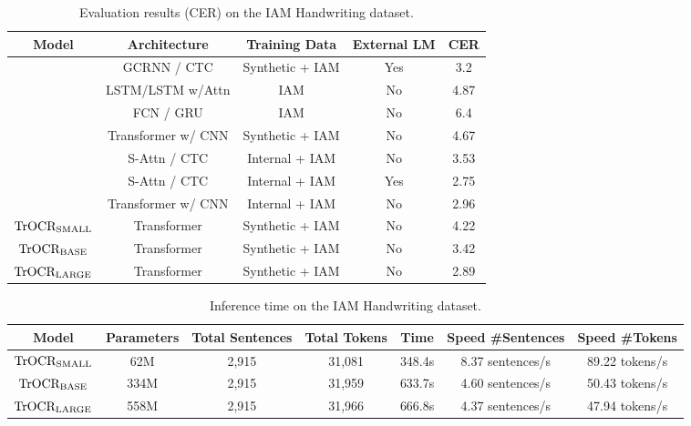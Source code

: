 \documentclass[letterpaper]{article} \usepackage{aaai23}  \usepackage{times}  \usepackage{helvet}  \usepackage{courier}  \usepackage[hyphens]{url}  \usepackage{graphicx} \urlstyle{rm} \def\UrlFont{\rm}  \usepackage{natbib}  \usepackage{caption} \frenchspacing  \setlength{\pdfpagewidth}{8.5in} \setlength{\pdfpageheight}{11in} \usepackage{algorithm}
\begin{document}
\begin{table*}[ht]
\centering
\begin{tabular}{ccccc}
\hline
\textbf{Model}      &\textbf{Architecture}             & \textbf{Training Data}   & \textbf{External LM} & \textbf{CER} \\ \hline

\cite{bluche2017gated}   &   GCRNN / CTC     & Synthetic + IAM          & Yes                  & 3.2          \\
\cite{michael2019evaluating}& LSTM/LSTM w/Attn  & IAM                      & No                   & 4.87         \\ 
\cite{wang2020decoupled}  &    FCN / GRU    & IAM                      & No                   & 6.4          \\

\cite{kang2020pay}      &    Transformer w/ CNN     & Synthetic + IAM          & No                   & 4.67         \\

\cite{diaz2021rethinking} & S-Attn / CTC      & Internal + IAM           & No                  & 3.53      \\
\cite{diaz2021rethinking}  &  S-Attn / CTC    & Internal + IAM          & Yes                  & 2.75         \\
\cite{diaz2021rethinking}  &  Transformer w/ CNN    & Internal + IAM          & No                  & 2.96         \\
\hline
$\textrm{TrOCR}_{\rm SMALL}$            &  Transformer        & Synthetic + IAM          & No                   & 4.22             \\
$\textrm{TrOCR}_{\rm BASE}$             &  Transformer        & Synthetic + IAM          & No                   & 3.42             \\
$\textrm{TrOCR}_{\rm LARGE}$             &   Transformer      & Synthetic + IAM          & No                   & 2.89             \\
\hline
\end{tabular}
\caption{Evaluation results (CER) on the IAM Handwriting dataset.}
\label{tab:iam}
\end{table*}


\begin{table*}
\centering
\begin{tabular}{ccccccc}\hline
\textbf{Model}       & \textbf{Parameters} & \textbf{Total Sentences} & \textbf{Total Tokens} & \textbf{Time}   & \textbf{Speed \#Sentences} & \textbf{Speed \#Tokens} \\
\hline
$\textrm{TrOCR}_{\rm SMALL}$ & 62M  & 2,915           & 31,081       & 348.4s & 8.37 sentences/s  & 89.22 tokens/s \\
$\textrm{TrOCR}_{\rm BASE}$  & 334M & 2,915           & 31,959       & 633.7s & 4.60 sentences/s  & 50.43 tokens/s \\
$\textrm{TrOCR}_{\rm LARGE}$ & 558M & 2,915           & 31,966       & 666.8s & 4.37 sentences/s  & 47.94 tokens/s \\
\hline
\end{tabular}
\caption{Inference time on the IAM Handwriting dataset.}
\label{tab:infer}
\end{table*}
\end{document}
